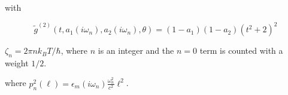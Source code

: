 \documentclass[a4paper]{article}
\begin{document}
\begin{center}
with

\begin{equation}
\tilde g^{(2)}(t, a_1(i \omega_n), a_2(i \omega_n), \theta) = (1-a_1)(1-a_2)(t^{2} + 2)^2
\label{befgqw}
\end{equation}

$\zeta_n = 2\pi n k_BT/\hbar$, where $n$ is an integer and the $n=0$ term is counted with a weight $1/2$. 

where $p_n^{2}(\ell) =  \epsilon_m(i \omega_n) \frac{\omega_n^{2}}{c^{2}} \ell^{2}$. 




\end{center}
\end{document}
